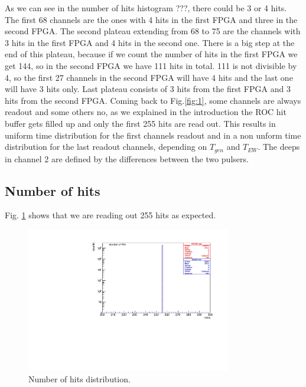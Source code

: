 As we can see in the number of hits histogram ???, there could be 3 or 4 hits. 
The first 68 channels are the ones with 4 hits in the first FPGA and three in the second FPGA. The second plateau extending from 68 to 75 are the channels with 3 hits in the first FPGA and 4 hits in the second one. There is a big step at the end of this plateau, because if we count the number of hits in the first FPGA we get 144, so in the second FPGA we have 111 hits in total. 111 is not divisible by 4, so the first 27 channels in the second FPGA will have 4 hits and the last one will have 3 hits only. Last plateau consists of 3 hits from the first FPGA and 3 hits from the second FPGA.
Coming back to Fig.\ref{fig:1}, some channels are always readout and some others no, as we explained in the introduction the ROC hit buffer gets filled up and only the first 255 hits are read out. This results in uniform time distribution for the first channels readout and in a non unform time distribution for the last readout channels, depending on $T_{gen}$ and $T_{EW}$. The deeps in channel 2 are defined by the differences between the two pulsers. 





\subsection{Number of hits}
 Fig. \ref{fig:3} shows that we are reading out 255 hits as expected.
\begin{figure}[!h]
\centering
\includegraphics[width =0.8\textwidth]{figures/pdf/figure_00008_nhits_281}
\caption{Number of hits distribution.}
\label{fig:3}
\end{figure}


